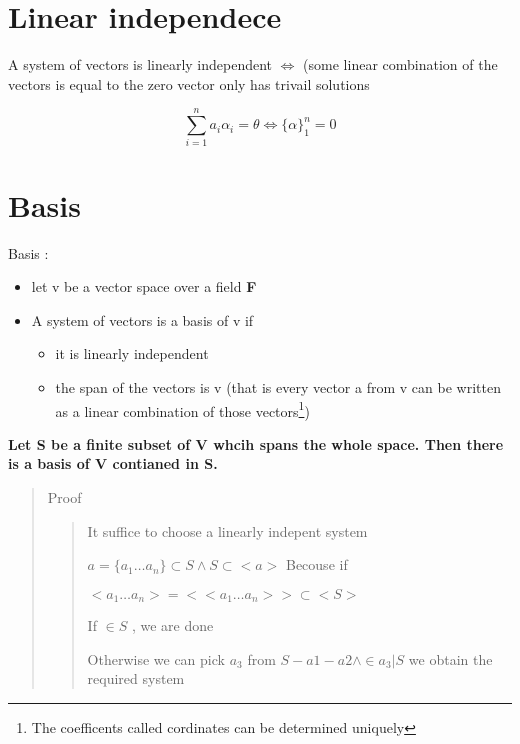 \documentclass[twocolumn]{article}
\date{}
\providecommand{\tightlist}{%
  \setlength{\itemsep}{0pt}\setlength{\parskip}{0pt}}
\begin{document}
\hypertarget{linear-independece}{%
\section{Linear independece}\label{linear-independece}}

A system of vectors is linearly independent \(\Leftrightarrow\) (some
linear combination of the vectors is equal to the zero vector only has
trivail solutions

\[\sum_{i=1}^n a_i \alpha_i = \theta \Leftrightarrow \{ \alpha\}_1 ^n = 0\]

\hypertarget{basis}{%
\section{Basis}\label{basis}}

Basis :

\begin{itemize}
\tightlist
\item
  let v be a vector space over a field \textbf{F}
\item
  A system of vectors is a basis of v if

  \begin{itemize}
  \tightlist
  \item
    it is linearly independent
  \item
    the span of the vectors is v (that is every vector a from v can be
    written as a linear combination of those vectors\footnote{The
      coefficents called cordinates can be determined uniquely})
  \end{itemize}
\end{itemize}

\textbf{Let S be a finite subset of V whcih spans the whole space. Then
there is a basis of V contianed in S.}

\begin{quote}
Proof

\begin{quote}
It suffice to choose a linearly indepent system

\(a = \{ a_1 \dots a_n \} \subset S \wedge S \subset <a>\) Becouse if

\(<a_1 \dots a_n> = <<a_1 \dots a_n>> \subset <S>\)

If \(<a1> \in S\) , we are done

Otherwise we can pick \(a_3\) from \(S-a1 - a2 \wedge \in a_3 |S\) we
obtain the required system
\end{quote}
\end{quote}
\end{document}
